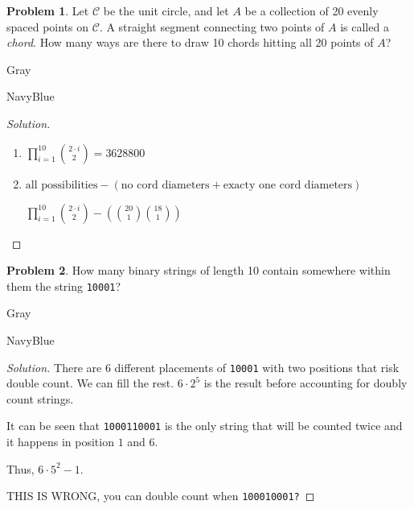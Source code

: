 \documentclass[12pt]{amsart}
\newcounter{problem_number}[section]
\theoremstyle{named}
\newenvironment{soln}
{\begin{color}{Gray}\begin{framed}\begin{color}{NavyBlue}\begin{proof}[Solution]
\doublespacing}
{\end{proof}\end{color}\end{framed}\end{color}}
\theoremstyle{definition}
\newtheorem{problem}{Problem}
\begin{document}
\begin{problem}
	Let $\mathcal C$ be the unit circle, and let $A$ be a collection of 20 evenly spaced points on $\mathcal C$.
	A straight segment connecting two points of $A$ is called a \emph{chord}.
	How many ways are there to draw 10 chords hitting all 20 points of $A$?
\end{problem}

\begin{soln}
    \phantom{ }

    \begin{enumerate}
        \item $\displaystyle\prod_{i=1}^{10}{2\cdot i \choose 2} = 3628800$
        
        \phantom{ }
        
        \item $\text{all possibilities} - (\text{no cord diameters} + \text{exacty one cord diameters})$
        
		\noindent $\displaystyle\prod_{i=1}^{10}{2\cdot i \choose 2} - ({20 \choose 1}{18 \choose 1})
		$
    \end{enumerate}
\end{soln}

\begin{problem}
	How many binary strings of length 10 contain somewhere within them the string \verb|10001|?
\end{problem}

\begin{soln}
    \phantom{ }

    \noindent There are $6$ different placements of \verb|10001| with two positions
    that risk double count. We can fill the rest. $6 \cdot 2^5$ is the result
    before accounting for doubly count strings.

    \noindent It can be seen that \verb|1000110001| is the only string that will be counted
	twice and it happens in position $1$ and $6$.

    \noindent Thus, $6 \cdot 5^2 - 1$. 

	THIS IS WRONG, you can double count when \verb|100010001?|
\end{soln}

\phantom{ }

\phantom{ }

\phantom{ }

\phantom{ }
\end{document}
